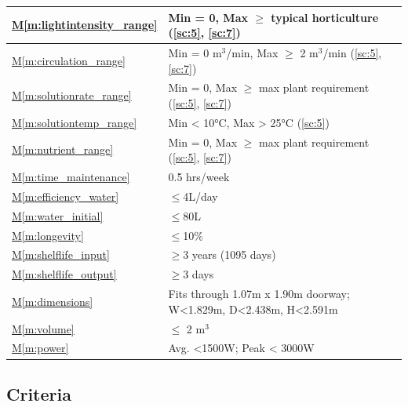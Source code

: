 \documentclass{../tex/report}
\newcommand{\mref}[1]{\hyperref[#1]{M\ref{#1}}}
\begin{document}
\begin{tabular}{|l|p{14.35cm}|}
    \hline
    \mref{m:lightintensity_range} & Min = 0, Max $\ge$ typical horticulture \hfill (\ref{sc:5}, \ref{sc:7}) \\
    \hline
    \mref{m:circulation_range} & Min = 0 m${}^3$/min, Max $\ge$ 2 m${}^3$/min \hfill (\ref{sc:5}, \ref{sc:7}) \\
    \hline
    \mref{m:solutionrate_range} & Min = 0, Max $\ge$ max plant requirement \hfill (\ref{sc:5}, \ref{sc:7}) \\
    \hline
    \mref{m:solutiontemp_range} & Min < 10°C, Max > 25°C \hfill (\ref{sc:5})\\
    \hline
    \mref{m:nutrient_range} & Min = 0, Max $\ge$ max plant requirement \hfill (\ref{sc:5}, \ref{sc:7}) \\
    \hline
    \mref{m:time_maintenance} & 0.5 hrs/week \hfill \cite{dsfc-phase2}\\
    \hline
    \mref{m:efficiency_water} & $\le$4L/day \hfill \cite{dsfc-phase2} \\
    \hline
    \mref{m:water_initial} & $\le$80L \hfill \cite{dsfc-phase2} \\
    \hline
    \mref{m:longevity} & $\le$10\% \hfill \cite{applicantguide,dsfc-phase2}\\
    \hline
    \mref{m:shelflife_input} & $\ge$3 years (1095 days) \hfill \cite{applicantguide,dsfc-phase2}\\
    \hline
    \mref{m:shelflife_output} & $\ge$3 days \hfill \cite{dsfc-phase2} \\
    \hline
    \mref{m:dimensions} & Fits through 1.07m x 1.90m doorway; W<1.829m, D<2.438m, H<2.591m \hfill \cite{applicantguide,dsfc-phase2} \\
    \hline
    \mref{m:volume} & $\le$ 2 m${}^3$ \hfill \cite{applicantguide,dsfc-phase2}\\
    \hline
    \mref{m:power} & Avg. <1500W; Peak < 3000W \hfill \cite{applicantguide,dsfc-phase2}\\
    \hline
\end{tabular}
\vfill
{}

\subsection{Criteria}
\label{sec:criteria}
\end{document}
